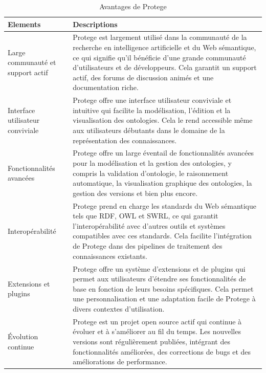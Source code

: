 \documentclass{article}
\begin{document}
	
	\begin{table}
		\begin{tabular}{|m{4cm}|m{12cm}|} %
			\hline
			\textbf{Elements} & \textbf{Descriptions} \\
			\hline
			Large communauté et support actif & Protege est largement utilisé dans la communauté de la recherche en intelligence artificielle et du Web sémantique, ce qui signifie qu'il bénéficie d'une grande communauté d'utilisateurs et de développeurs. Cela garantit un support actif, des forums de discussion animés et une documentation riche. \\
			\hline
			Interface utilisateur conviviale & Protege offre une interface utilisateur conviviale et intuitive qui facilite la modélisation, l'édition et la visualisation des ontologies. Cela le rend accessible même aux utilisateurs débutants dans le domaine de la représentation des connaissances. \\
			\hline
			Fonctionnalités avancées & Protege offre un large éventail de fonctionnalités avancées pour la modélisation et la gestion des ontologies, y compris la validation d'ontologie, le raisonnement automatique, la visualisation graphique des ontologies, la gestion des versions et bien plus encore. \\
			\hline
			Interopérabilité & Protege prend en charge les standards du Web sémantique tels que RDF, OWL et SWRL, ce qui garantit l'interopérabilité avec d'autres outils et systèmes compatibles avec ces standards. Cela facilite l'intégration de Protege dans des pipelines de traitement des connaissances existants. \\
			\hline
			Extensions et plugins & Protege offre un système d'extensions et de plugins qui permet aux utilisateurs d'étendre ses fonctionnalités de base en fonction de leurs besoins spécifiques. Cela permet une personnalisation et une adaptation facile de Protege à divers contextes d'utilisation. \\
			\hline
			Évolution continue & Protege est un projet open source actif qui continue à évoluer et à s'améliorer au fil du temps. Les nouvelles versions sont régulièrement publiées, intégrant des fonctionnalités améliorées, des corrections de bugs et des améliorations de performance. \\
			\hline
		\end{tabular}
		\caption{Avantages de Protege}
		\label{tab:protege_advantages}
	\end{table} 
\end{document}
